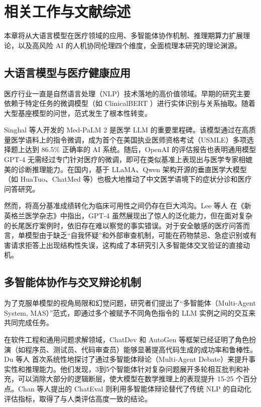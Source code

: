 \documentclass[11pt,a4paper]{ctexart}
\begin{document}
\newpage
\section{相关工作与文献综述}

本章将从大语言模型在医疗领域的应用、多智能体协作机制、推理期算力扩展理论，以及高风险 AI 的人机协同伦理四个维度，全面梳理本研究的理论渊源。

\subsection{大语言模型与医疗健康应用}

医疗行业一直是自然语言处理（NLP）技术落地的高价值领域。早期的研究主要依赖于特定任务的微调模型（如 ClinicalBERT \cite{alsentzer2019public}）进行实体识别与关系抽取。随着大型基座模型的问世，范式发生了根本性转变。

Singhal 等人开发的 Med-PaLM 2 \cite{singhal2023medpalm} 是医学 LLM 的重要里程碑。该模型通过在高质量医学语料上的指令微调，成为首个在美国执业医师资格考试（USMLE）多项选择题上达到 86.5\% 正确率的 AI 系统。随后，OpenAI 的评估报告也表明通用模型 GPT-4 \cite{nori2023capabilities} 无需经过专门针对医疗的微调，即可在类似基准上表现出与医学专家相媲美的诊断推理能力。在国内，基于 LLaMA、Qwen 架构开源的垂直医学大模型（如 HuaTuo、ChatMed 等）也极大地推动了中文医学语境下的症状分诊和医疗问答研究。

然而，将高分基准成绩转化为临床可用性之间仍存在巨大鸿沟。Lee 等人 \cite{lee2023benefits} 在《新英格兰医学杂志》中指出，GPT-4 虽然展现出了惊人的泛化能力，但在面对复杂的长尾医疗案例时，依旧存在难以察觉的事实错误。对于安全敏感的医疗问答而言，单模型由于缺乏“自我怀疑”和外部审查机制，可能在药物禁忌、急症识别或有害请求拒答上出现结构性失误，这构成了本研究引入多智能体交叉验证的直接动机。

\subsection{多智能体协作与交叉辩论机制}

为了克服单模型的视角局限和幻觉问题，研究者们提出了“多智能体（Multi-Agent System, MAS）”范式，即通过多个被赋予不同角色指令的 LLM 实例之间的交互来共同完成任务。

在软件工程和通用问题求解领域，ChatDev \cite{qian2023communicative} 和 AutoGen 等框架已经证明了角色扮演（如程序员、测试员、代码审查员）能够显著提高代码生成的成功率和鲁棒性。Du 等人 \cite{du2024improving} 首次系统性地探讨了通过多智能体辩论（Multi-Agent Debate）来提升事实性和推理能力。他们发现，3到5个智能体针对复杂问题展开多轮相互批判和补充，可以消除大部分的逻辑断层，使大模型在数学推理上的表现提升 15-25 个百分点。Chan 等人提出的 ChatEval \cite{chan2024chateval} 则利用多智能体辩论替代了传统 NLP 的自动化评估指标，取得了与人类评估高度一致的结论。
\end{document}
